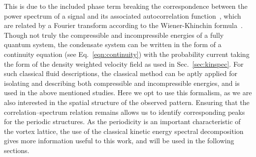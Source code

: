 This is due to the included phase term breaking the correspondence between the power spectrum of a signal and its associated autocorrelation function~\cite{VTX:Reeves_pra_2014}, which are related by a Fourier transform according to the Wiener-Khinchin formula~\cite{BK:Turbulence_Frisch_p54}. Though not truly the compressible and incompressible energies of a fully quantum system, the condensate system can be written in the form of a continuity equation (see Eq.~\eqref{eqn:continuity}) with the probability current taking the form of the density weighted velocity field as used in Sec.~\ref{sec:kinspec}. For such classical fluid descriptions, the classical method can be aptly applied for isolating and describing both compressible and incompressible energies, and is used in the above mentioned studies. Here we opt to use this formalism, as we are also interested in the spatial structure of the observed pattern. Ensuring that the correlation--spectrum relation remains allows us to identify corresponding peaks for the periodic structures. As the periodicity is an important characteristic of the vortex lattice, the use of the classical kinetic energy spectral decomposition gives more information useful to this work, and will be used in the following sections.




